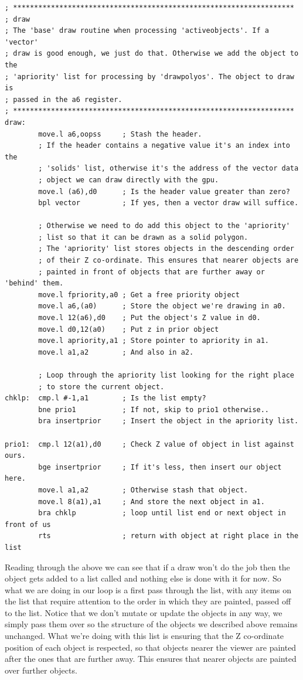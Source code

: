 \begin{lstlisting}
; *******************************************************************
; draw
; The 'base' draw routine when processing 'activeobjects'. If a 'vector'
; draw is good enough, we just do that. Otherwise we add the object to the
; 'apriority' list for processing by 'drawpolyos'. The object to draw is
; passed in the a6 register.
; *******************************************************************
draw:
        move.l a6,oopss     ; Stash the header.
        ; If the header contains a negative value it's an index into the
        ; 'solids' list, otherwise it's the address of the vector data
        ; object we can draw directly with the gpu.
        move.l (a6),d0      ; Is the header value greater than zero?
        bpl vector          ; If yes, then a vector draw will suffice.
    
        ; Otherwise we need to do add this object to the 'apriority'
        ; list so that it can be drawn as a solid polygon.
        ; The 'apriority' list stores objects in the descending order
        ; of their Z co-ordinate. This ensures that nearer objects are
        ; painted in front of objects that are further away or 'behind' them.
        move.l fpriority,a0 ; Get a free priority object
        move.l a6,(a0)      ; Store the object we're drawing in a0.
        move.l 12(a6),d0    ; Put the object's Z value in d0.
        move.l d0,12(a0)    ; Put z in prior object
        move.l apriority,a1 ; Store pointer to apriority in a1.
        move.l a1,a2        ; And also in a2.

        ; Loop through the apriority list looking for the right place
        ; to store the current object.
chklp:  cmp.l #-1,a1        ; Is the list empty?
        bne prio1           ; If not, skip to prio1 otherwise..
        bra insertprior     ; Insert the object in the apriority list.
    
prio1:  cmp.l 12(a1),d0     ; Check Z value of object in list against ours. 
        bge insertprior     ; If it's less, then insert our object here.
        move.l a1,a2        ; Otherwise stash that object.
        move.l 8(a1),a1     ; And store the next object in a1.
        bra chklp           ; loop until list end or next object in front of us
        rts                 ; return with object at right place in the list
\end{lstlisting}

Reading through the above we can see that if a  draw won't do the job then the object gets
added to a list called  and nothing else is done with it for now. So what we are doing in our
 loop is a first pass through the  list, with any items on the list that 
require attention to the order in which they are painted, passed off to the  list. Notice
that we don't mutate or update the objects in any way, we simply pass them over so the structure of the objects
we described above remains unchanged. What we're doing with this list is ensuring that the Z co-ordinate position
of each object is respected, so that objects nearer the viewer are painted after the ones that are further away. This
ensures that nearer objects are painted over further objects.

